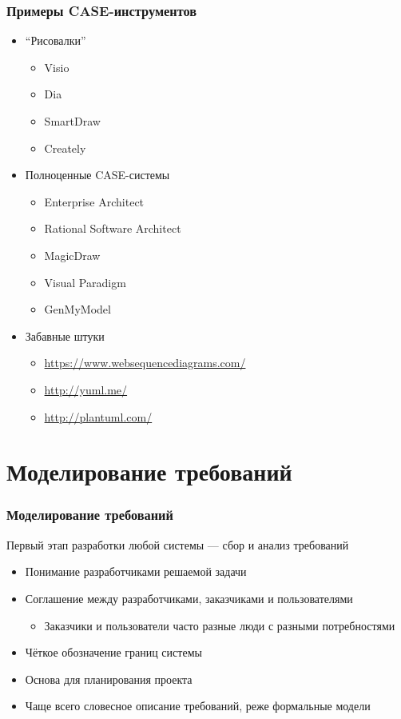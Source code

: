 \documentclass[xetex,mathserif,serif]{beamer}
\begin{document}
	\begin{frame}
		\frametitle{Примеры CASE-инструментов}
		\begin{itemize}
			\item ``Рисовалки''
			\begin{itemize}
				\item Visio
				\item Dia
				\item SmartDraw
				\item Creately
			\end{itemize}
			\item Полноценные CASE-системы
			\begin{itemize}
				\item Enterprise Architect
				\item Rational Software Architect
				\item MagicDraw
				\item Visual Paradigm
				\item GenMyModel
			\end{itemize}
			\item Забавные штуки
			\begin{itemize}
				\item \url{https://www.websequencediagrams.com/}
				\item \url{http://yuml.me/}
				\item \url{http://plantuml.com/}
			\end{itemize}
		\end{itemize}
	\end{frame}

	\section{Моделирование требований}

	\begin{frame}
		\frametitle{Моделирование требований}
		Первый этап разработки любой системы --- сбор и анализ требований
		\begin{itemize}
			\item Понимание разработчиками решаемой задачи
			\item Соглашение между разработчиками, заказчиками и пользователями
			\begin{itemize}
				\item Заказчики и пользователи часто разные люди с разными потребностями
			\end{itemize}
			\item Чёткое обозначение границ системы
			\item Основа для планирования проекта
			\item Чаще всего словесное описание требований, реже формальные модели
		\end{itemize}
	\end{frame}
\end{document}
